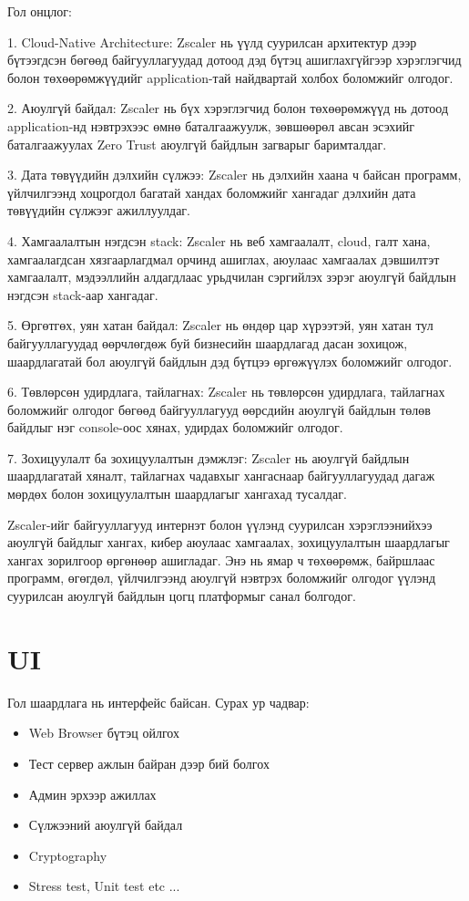 							Гол онцлог:
					
							1. Cloud-Native Architecture: Zscaler нь үүлд суурилсан архитектур дээр бүтээгдсэн бөгөөд байгууллагуудад дотоод дэд бүтэц ашиглахгүйгээр хэрэглэгчид болон төхөөрөмжүүдийг application-тай найдвартай холбох боломжийг олгодог.
							
							2. Аюулгүй байдал: Zscaler нь бүх хэрэглэгчид болон төхөөрөмжүүд нь дотоод application-нд нэвтрэхээс өмнө баталгаажуулж, зөвшөөрөл авсан эсэхийг баталгаажуулах Zero Trust аюулгүй байдлын загварыг баримталдаг.
							
							3. Дата төвүүдийн дэлхийн сүлжээ: Zscaler нь дэлхийн хаана ч байсан программ, үйлчилгээнд хоцрогдол багатай хандах боломжийг хангадаг дэлхийн дата төвүүдийн сүлжээг ажиллуулдаг.
							
							4. Хамгаалалтын нэгдсэн stack: Zscaler нь веб хамгаалалт, cloud, галт хана, хамгаалагдсан хязгаарлагдмал орчинд ашиглах, аюулаас хамгаалах дэвшилтэт хамгаалалт, мэдээллийн алдагдлаас урьдчилан сэргийлэх зэрэг аюулгүй байдлын нэгдсэн stack-аар хангадаг.
							
							5. Өргөтгөх, уян хатан байдал: Zscaler нь өндөр цар хүрээтэй, уян хатан тул байгууллагуудад өөрчлөгдөж буй бизнесийн шаардлагад дасан зохицож, шаардлагатай бол аюулгүй байдлын дэд бүтцээ өргөжүүлэх боломжийг олгодог.
							
							6. Төвлөрсөн удирдлага, тайлагнах: Zscaler нь төвлөрсөн удирдлага, тайлагнах боломжийг олгодог бөгөөд байгууллагууд өөрсдийн аюулгүй байдлын төлөв байдлыг нэг console-оос хянах, удирдах боломжийг олгодог.
							
							7. Зохицуулалт ба зохицуулалтын дэмжлэг: Zscaler нь аюулгүй байдлын шаардлагатай хяналт, тайлагнах чадавхыг хангаснаар байгууллагуудад дагаж мөрдөх болон зохицуулалтын шаардлагыг хангахад тусалдаг.
							
							Zscaler-ийг байгууллагууд интернэт болон үүлэнд суурилсан хэрэглээнийхээ аюулгүй байдлыг хангах, кибер аюулаас хамгаалах, зохицуулалтын шаардлагыг хангах зорилгоор өргөнөөр ашигладаг. Энэ нь ямар ч төхөөрөмж, байршлаас программ, өгөгдөл, үйлчилгээнд аюулгүй нэвтрэх боломжийг олгодог үүлэнд суурилсан аюулгүй байдлын цогц платформыг санал болгодог. 
	\pagebreak
			
\section{UI}
Гол шаардлага нь интерфейс байсан.
Сурах ур чадвар: 
\begin{itemize}
    \item Web Browser бүтэц ойлгох
    \item Тест сервер ажлын байран дээр бий болгох
    \item Админ эрхээр ажиллах
    \item Сүлжээний аюулгүй байдал
    \item Cryptography
    \item Stress test, Unit test etc ...
\end{itemize}

